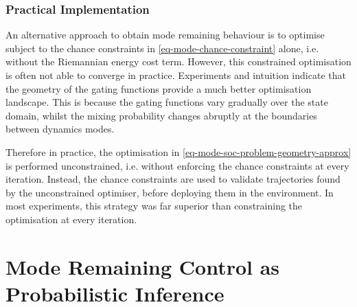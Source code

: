 \documentclass{mimosis-class/mimosis}
\numberwithin{equation}{chapter}
\newcommand{\modeInd}{\ensuremath{k}}
\newcommand{\state}{\ensuremath{\mathbf{x}}}
\newcommand{\control}{\ensuremath{\mathbf{u}}}
\newcommand{\modeVar}{\ensuremath{\alpha}}
\begin{document}
{\subsubsection{Practical Implementation}
\label{sec:org44dc2eb}
An alternative approach to obtain mode remaining behaviour is to optimise subject to the chance constraints
in \cref{eq-mode-chance-constraint} alone, i.e. without the Riemannian energy cost term.
However, this constrained optimisation is often not able to converge in practice.
Experiments and intuition indicate that the geometry of the gating functions provide a much
better optimisation landscape.
This is because the gating functions vary gradually over the state domain, whilst the mixing probability changes
abruptly at the boundaries between dynamics modes.

Therefore in practice, the optimisation in \cref{eq-mode-soc-problem-geometry-approx}
is performed unconstrained, i.e. without enforcing the chance constraints at every iteration.
Instead, the chance constraints are used to validate trajectories found by the unconstrained
optimiser, before deploying them in the environment.
In most experiments, this strategy was far superior than constraining the optimisation at every iteration.

\section{Mode Remaining Control as Probabilistic Inference \label{chap-traj-opt-inference}}
\label{sec:orge959f6a}
\newcommand{\startStateDist}{\ensuremath{p(\state_{1})}}
\newcommand{\transitionDist}{\ensuremath{p(\state_{\timeInd+1} \mid \state_\timeInd, \control_\timeInd, \modeVar_{\timeInd}=\desiredMode)}}
\renewcommand{\controlDist}{\ensuremath{\policy(\control_\timeInd \mid \state_\timeInd)}}


\renewcommand{\trajectoryVarDist}{\ensuremath{q(\stateTraj, \controlTraj \mid \state_0, \modeVarTraj)}}
\newcommand{\controlTrajVarDist}{\ensuremath{q(\control_{0:\TimeInd} \mid \state_{0:\TimeInd})}}
\newcommand{\controlVarDist}{\ensuremath{q(\control_{\timeInd})}}

\newcommand{\optimalVar}{\ensuremath{\mathcal{O}}}
\newcommand{\monotonicFunc}{\ensuremath{g}}
\newcommand{\temperature}{\ensuremath{\gamma}}

\newcommand{\optimalVarTraj}{\ensuremath{\bar{\bm{\optimalVar}}}}

\newcommand{\modeProb}{\ensuremath{\Pr(\modeVar_\timeInd = \modeInd \mid \state_\timeInd, \control_\timeInd)}}
\renewcommand{\optimalProb}{\ensuremath{\Pr(\optimalVar_\timeInd = 1 \mid \state_\timeInd, \control_\timeInd)}}
\newcommand{\optimalDist}{\ensuremath{P(\optimalVar_\timeInd \mid \state_\timeInd, \control_\timeInd)}}

}
\end{document}
